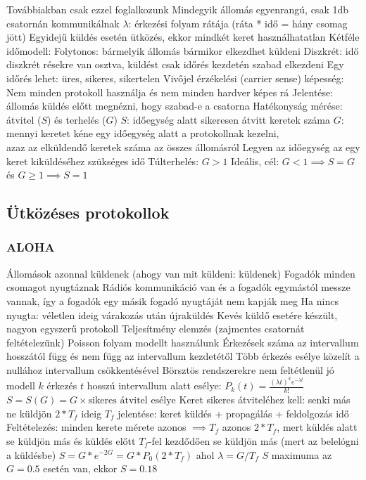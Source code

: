 \documentclass[12pt,a4paper]{article}
\begin{document}
\begin{outline}
	\1 Továbbiakban csak ezzel foglalkozunk
	\1 Mindegyik állomás egyenrangú, csak 1db csatornán kommunikálnak
	\1 $\lambda$: érkezési folyam rátája (ráta * idő = hány csomag jött)
	\1 Egyidejű küldés esetén ütközés, ekkor mindkét keret használhatatlan
	\1 Kétféle időmodell:
		\2 Folytonos: bármelyik állomás bármikor elkezdhet küldeni
		\2 Diszkrét: idő diszkrét résekre van osztva, küldést csak időrés kezdetén szabad elkezdeni
			\3 Egy időrés lehet: üres, sikeres, sikertelen
	\1 Vivőjel érzékelési (carrier sense) képesség:
		\2 Nem minden protokoll használja és nem minden hardver képes rá
		\2 Jelentése: állomás küldés előtt megnézni, hogy szabad-e a csatorna
	\1 Hatékonyság mérése: átvitel ($S$) és terhelés ($G$)
		\2 $S$: időegység alatt sikeresen átvitt keretek száma
		\2 $G$: mennyi keretet kéne egy időegység alatt a protokollnak kezelni,\\
		azaz az elküldendő keretek száma az összes állomásról
		\2 Legyen az időegység az egy keret kiküldéséhez szükséges idő
			\3 Túlterhelés: $G > 1$
			\3 Ideális, cél: $G < 1 \implies S=G$ és $G \ge 1 \implies S=1$
\end{outline}

\pagebreak

\subsection{Ütközéses protokollok}

\subsubsection{ALOHA}

\begin{outline}
	\1 Állomások azonnal küldenek (ahogy van mit küldeni: küldenek)
	\1 Fogadók minden csomagot nyugtáznak
		\2 Rádiós kommunikáció van és a fogadók egymástól messze vannak, így a fogadók egy másik fogadó nyugtáját nem kapják meg
	\1 Ha nincs nyugta: véletlen ideig várakozás után újraküldés
	\1 Kevés küldő esetére készült, nagyon egyszerű protokoll
	\1 Teljesítmény elemzés (zajmentes csatornát feltételezünk)
		\2 Poisson folyam modellt használunk
			\3 Érkezések száma az intervallum hosszától függ és nem függ az intervallum kezdetétől
			\3 Több érkezés esélye közelít a nullához intervallum csökkentésével
			\3 Börsztös rendszerekre nem feltétlenül jó modell
		\2 $k$ érkezés $t$ hosszú intervallum alatt esélye: $P_k(t) = \frac{(\lambda t)^k e^{-\lambda t}}{k!}$
		\2 $S = S(G) = G \times \text{sikeres átvitel esélye}$
		\2 Keret sikeres átviteléhez kell: senki más ne küldjön $2*T_f$ ideig
			\3 $T_f$ jelentése: keret küldés + propagálás + feldolgozás idő
			\3 Feltételezés: minden kerete mérete azonos $\implies T_f$ azonos
			\3 $2*T_f$, mert küldés alatt se küldjön más és küldés előtt $T_f$-fel kezdődően se küldjön más (mert az belelógni a küldésbe)
		\2 $S = G*e^{-2G} = G * P_0(2*T_f)$ ahol $\lambda = G / T_f$
			\3 $S$ maximuma az $G=0.5$ esetén van, ekkor $S=0.18$
\end{outline}
\end{document}

